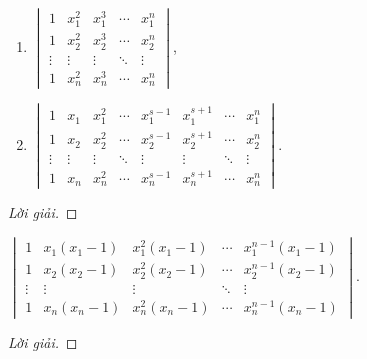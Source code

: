 \documentclass[class=linearalgebra,crop=false]{standalone}
\begin{document}
\begin{exercise}
    \begin{enumerate}[label = (\alph*)]
        \item $\begin{vmatrix}
            1      & x_{1}^{2} & x_{1}^{3} & \cdots & x_{1}^{n} \\
            1      & x_{2}^{2} & x_{2}^{3} & \cdots & x_{2}^{n} \\
            \vdots & \vdots    & \vdots    & \ddots & \vdots    \\
            1      & x_{n}^{2} & x_{n}^{3} & \cdots & x_{n}^{n}
        \end{vmatrix}$,
        \item $\begin{vmatrix}
            1      & x_{1}  & x_{1}^{2} & \cdots & x_{1}^{s-1} & x_{1}^{s+1} & \cdots & x_{1}^{n} \\
            1      & x_{2}  & x_{2}^{2} & \cdots & x_{2}^{s-1} & x_{2}^{s+1} & \cdots & x_{2}^{n} \\
            \vdots & \vdots & \vdots    & \ddots & \vdots      & \vdots      & \ddots & \vdots    \\
            1      & x_{n}  & x_{n}^{2} & \cdots & x_{n}^{s-1} & x_{n}^{s+1} & \cdots & x_{n}^{n}
        \end{vmatrix}$.
    \end{enumerate}
\end{exercise}

\begin{proof}[Lời giải]
\end{proof}

\begin{exercise}
    $\begin{vmatrix}
        1      & x_{1}(x_{1} - 1) & x_{1}^{2}(x_{1} - 1) & \cdots & x_{1}^{n-1}(x_{1} - 1) \\
        1      & x_{2}(x_{2} - 1) & x_{2}^{2}(x_{2} - 1) & \cdots & x_{2}^{n-1}(x_{2} - 1) \\
        \vdots & \vdots           & \vdots               & \ddots & \vdots                 \\
        1      & x_{n}(x_{n} - 1) & x_{n}^{2}(x_{n} - 1) & \cdots & x_{n}^{n-1}(x_{n} - 1)
    \end{vmatrix}$.
\end{exercise}

\begin{proof}[Lời giải]
\end{proof}
\end{document}
